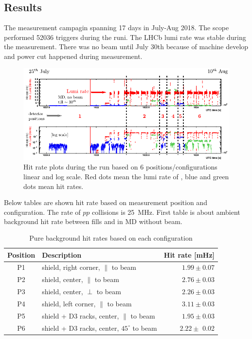 \subsection{Results}

The measurement campagin spanning 17 days in July-Aug 2018.
The scope performed 52036 triggers during the runi.
The LHCb lumi rate was stable during the measurement.
There was no beam until July 30th because of machine develop and power cut happened during measurement.

\vspace{0.2cm}
\begin{figure}[h]
\centering
    \includegraphics[width=12cm]{figs/INT/codexb_data_global.pdf}
\caption{
    Hit rate plots during the run based on 6 positions/configurations linear and log scale. Red dots mean the lumi rate of \lhcb, blue and green dots mean hit rates.
}
\end{figure}

Below tables are shown hit rate based on measurement position and configuration.
The rate of $pp$ collisions is 25~MHz.
First table is about ambient background hit rate between fills and in MD without beam.

\begin{table}
\begin{center}
\begin{tabular}{c|l|r}
  Position & \hspace{2cm}Description & Hit rate [mHz] \\
  \hline \hline
   P1 & shield, right corner, $\parallel$ to beam& $1.99\pm0.07$ \\ \hline
   P2 & shield, center, $\parallel$ to beam&  $2.76\pm 0.03$ \\ \hline
   P3 & shield, center, $\perp$ to beam& $ 2.26\pm 0.03$ \\ \hline
   P4 & shield, left corner, $\parallel$ to beam& $ 3.11\pm 0.03$ \\ \hline
   P5 & shield + D3 racks, center, $\parallel$ to beam& $ 1.95\pm 0.03$ \\ \hline
   P6 & shield + D3 racks, center, $45^\circ$ to beam& $ 2.22\pm $ 0.02\\ \hline
\end{tabular}
\caption{
    Pure background hit rates based on each configuration
}
\end{center}
\end{table}

